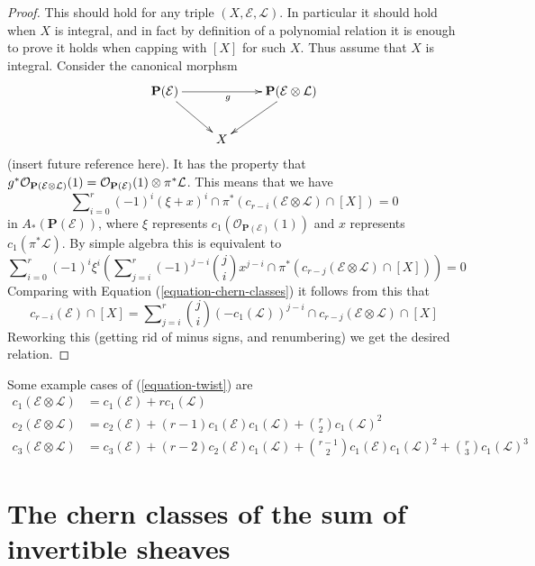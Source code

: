 \begin{proof}
This should hold for any triple $(X, \mathcal{E}, \mathcal{L})$.
In particular it should hold when $X$ is integral, and in fact by
definition of a polynomial relation it is enough to prove
it holds when capping with $[X]$ for such $X$. Thus assume
that $X$ is integral. Consider the canonical morphsm
$$
\xymatrix{
{\bf P}({\mathcal E})\ar[rd] \ar[rr]_g
&
&
{\bf P}({\mathcal E} \otimes \mathcal{L})\ar[ld]
\cr
& X & 
\cr}
$$
(insert future reference here). It has the property that
$g^*{\mathcal O}_{{\bf P}({\mathcal E} \otimes \mathcal{L})}(1) 
= {\mathcal O}_{{\bf P}({\mathcal E})}(1) \otimes \pi^* {\mathcal L}$.
This means that we have
$$
\sum\nolimits_{i = 0}^r
(-1)^i
(\xi + x)^i \cap \pi^*(c_{r - i}(\mathcal{E} \otimes \mathcal{L}) \cap [X])
=
0
$$
in $A_*(\mathbf{P}(\mathcal{E}))$, where $\xi$ represents
$c_1(\mathcal{O}_{\mathbf{P}(\mathcal{E})}(1))$ and $x$
represents $c_1(\pi^*\mathcal{L})$. By simple algebra this
is equivalent to
$$
\sum\nolimits_{i = 0}^r
(-1)^i \xi^i \left(
\sum\nolimits_{j = i}^r
(-1)^{j - i}
\binom{j}{i}
x^{j - i} \cap
\pi^*(c_{r - j}(\mathcal{E} \otimes \mathcal{L}) \cap [X])
\right)
=
0
$$
Comparing with
Equation (\ref{equation-chern-classes}) it follows from this that
$$
c_{r - i}(\mathcal{E}) \cap [X] =
\sum\nolimits_{j = i}^r
\binom{j}{i}
(-c_1(\mathcal{L}))^{j - i} \cap
c_{r - j}(\mathcal{E} \otimes \mathcal{L}) \cap [X]
$$
Reworking this (getting rid of minus signs, and renumbering) we get
the desired relation.
\end{proof}

\noindent
Some example cases of (\ref{equation-twist}) are
\begin{align*}
c_1(\mathcal{E} \otimes \mathcal{L})
& =
c_1(\mathcal{E}) +
r c_1(\mathcal{L}) \\
c_2(\mathcal{E} \otimes \mathcal{L})
& =
c_2(\mathcal{E}) +
(r - 1) c_1(\mathcal{E}) c_1(\mathcal{L}) +
\binom{r}{2} c_1(\mathcal{L})^2 \\
c_3(\mathcal{E} \otimes \mathcal{L})
& =
c_3(\mathcal{E}) +
(r - 2) c_2(\mathcal{E})c_1(\mathcal{L}) + 
\binom{r - 1}{2} c_1(\mathcal{E})c_1(\mathcal{L})^2 +
\binom{r}{3} c_1(\mathcal{L})^3
\end{align*}








\section{The chern classes of the sum of invertible sheaves}
\label{section-chern-sum-linebundles}


